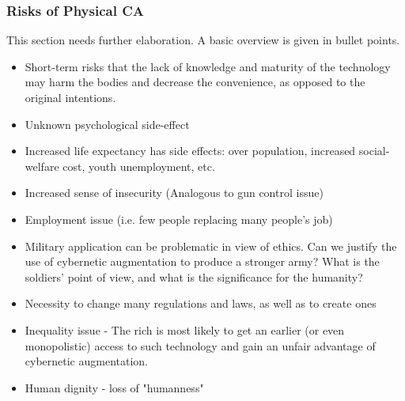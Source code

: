 \subsubsection{Risks of Physical CA}
{\color{red} This section needs further elaboration. A basic overview is given in bullet points.}


\begin{itemize}
	\item Short-term risks that the lack of knowledge and maturity of the technology may harm the bodies and decrease the convenience, as opposed to the original intentions.
	\item Unknown psychological side-effect
	\item Increased life expectancy has side effects: over population, increased social-welfare cost, youth unemployment, etc.
	\item Increased sense of insecurity (Analogous to gun control issue)
	\item Employment issue (i.e. few people replacing many people's job)
	\item Military application can be problematic in view of ethics. Can we justify the use of cybernetic augmentation to produce a stronger army? What is the soldiers' point of view, and what is the significance for the humanity?
	\item Necessity to change many regulations and laws, as well as to create ones
	\item Inequality issue - The rich is most likely to get an earlier (or even monopolistic) access to such technology and gain an unfair advantage of cybernetic augmentation.
	\item Human dignity - loss of "humanness"
	
\end{itemize}